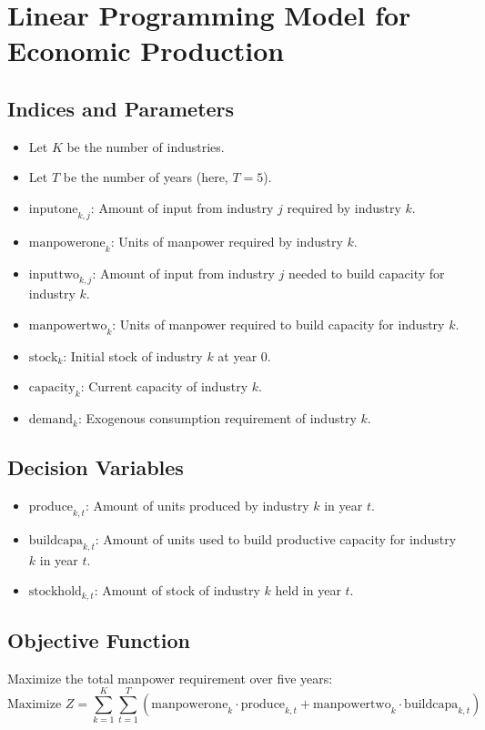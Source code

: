 \documentclass{article}
\begin{document}
\section*{Linear Programming Model for Economic Production}

\subsection*{Indices and Parameters}
\begin{itemize}
    \item Let \( K \) be the number of industries.
    \item Let \( T \) be the number of years (here, \( T = 5 \)).
    \item \( \text{inputone}_{k,j} \): Amount of input from industry \( j \) required by industry \( k \).
    \item \( \text{manpowerone}_{k} \): Units of manpower required by industry \( k \).
    \item \( \text{inputtwo}_{k,j} \): Amount of input from industry \( j \) needed to build capacity for industry \( k \).
    \item \( \text{manpowertwo}_{k} \): Units of manpower required to build capacity for industry \( k \).
    \item \( \text{stock}_{k} \): Initial stock of industry \( k \) at year 0.
    \item \( \text{capacity}_{k} \): Current capacity of industry \( k \).
    \item \( \text{demand}_{k} \): Exogenous consumption requirement of industry \( k \).
\end{itemize}

\subsection*{Decision Variables}
\begin{itemize}
    \item \( \text{produce}_{k,t} \): Amount of units produced by industry \( k \) in year \( t \).
    \item \( \text{buildcapa}_{k,t} \): Amount of units used to build productive capacity for industry \( k \) in year \( t \).
    \item \( \text{stockhold}_{k,t} \): Amount of stock of industry \( k \) held in year \( t \).
\end{itemize}

\subsection*{Objective Function}
Maximize the total manpower requirement over five years:
\[
\text{Maximize } Z = \sum_{k=1}^{K} \sum_{t=1}^{T} \left( \text{manpowerone}_{k} \cdot \text{produce}_{k,t} + \text{manpowertwo}_{k} \cdot \text{buildcapa}_{k,t} \right)
\]
\end{document}

